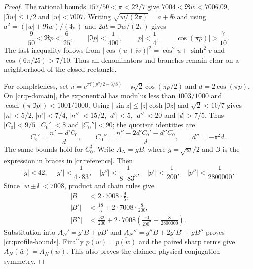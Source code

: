 \begin{proof}
The rational bounds $157/50<\pi<22/7$ give
$7004<\Re w<7006.09$, $|\Im w|\le1/2$ and $|w|<7007$.
Writing $\sqrt{w/(2\pi)}=a+\ii b$ and using
$a^2=(|w|+\Re w)/(4\pi)$ and $2ab=\Im w/(2\pi)$ gives
\begin{equation}
 \frac9{50}<\Re p<\frac6{25},\qquad |\Im p|<\frac1{400},
 \qquad |p|<\frac14,\qquad |\cos(\pi p)|>\frac7{10}.
 \label{cr:p-domain}
\end{equation}
The last inequality follows from
$|\cos(u+\ii v)|^2=\cos^2u+\sinh^2v$ and
$\cos(6\pi/25)>7/10$. Thus all denominators and branches remain
clear on a neighborhood of the closed rectangle.

For completeness, set $n=e^{\pi\ii(p^2/2+3/8)}-
\ii\sqrt2\cos(\pi p/2)$ and $d=2\cos(\pi p)$.
On \eqref{cr:p-domain}, the exponential has modulus less than
$1003/1000$ and $\cosh(\pi|\Im p|)<1001/1000$. Using
$|\sin z|\le|z|\cosh|\Im z|$ and $\sqrt2<10/7$ gives
$|n|<5/2$, $|n'|<7/4$, $|n''|<15/2$,
$|d'|<5$, $|d''|<20$ and $|d|>7/5$. Thus
$|C_0|<9/5$, $|C_0'|<8$ and $|C_0''|<90$;
the quotient identities are
\[
 C_0'=\frac{n'-d'C_0}{d},\qquad
 C_0''=\frac{n''-2d'C_0'-d''C_0}{d},\qquad d''=-\pi^2d.
\]
The same bounds hold for $C_0^\sharp$. Write $A_N=gB$, where
$g=\sqrt w/2$ and $B$ is the expression in braces in
\eqref{cr:reference}. Then
\[
 |g|<42,\quad |g'|<\frac1{4\cdot83},\quad
 |g''|<\frac1{8\cdot83^3},\quad
 |p'|<\frac1{200},\quad |p''|<\frac1{2800000}.
\]
Since $|w\pm\ii|<7008$, product and chain rules give
\begin{align*}
 |B|&<2\cdot7008\cdot\frac95,\\
 |B'|&<\frac{18}5+2\cdot7008\cdot\frac8{200},\\
 |B''|&<\frac{32}{200}
   +2\cdot7008\left(\frac{90}{200^2}
                        +\frac8{2800000}\right).
\end{align*}
Substitution into $A_N'=g'B+gB'$ and
$A_N''=g''B+2g'B'+gB''$ proves \eqref{cr:profile-bounds}.
Finally $p(\bar w)=\overline{p(w)}$ and the paired sharp terms give
$A_N(\bar w)=\overline{A_N(w)}$. This also proves the claimed
physical conjugation symmetry.
\end{proof}

